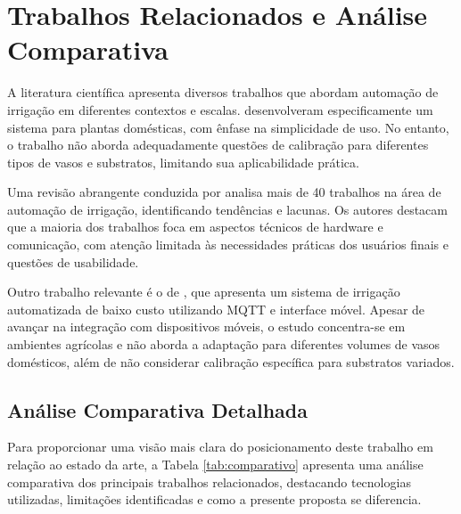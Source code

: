 \documentclass[twoside,english,brazilian]{UNISINOSmonografia}
\begin{document}
\section{Trabalhos Relacionados e Análise Comparativa}

A literatura científica apresenta diversos trabalhos que abordam automação de irrigação em diferentes contextos e escalas.  desenvolveram especificamente um sistema para plantas domésticas, com ênfase na simplicidade de uso. No entanto, o trabalho não aborda adequadamente questões de calibração para diferentes tipos de vasos e substratos, limitando sua aplicabilidade prática.

Uma revisão abrangente conduzida por  analisa mais de 40 trabalhos na área de automação de irrigação, identificando tendências e lacunas. Os autores destacam que a maioria dos trabalhos foca em aspectos técnicos de hardware e comunicação, com atenção limitada às necessidades práticas dos usuários finais e questões de usabilidade.

Outro trabalho relevante é o de , que apresenta um sistema de irrigação automatizada de baixo custo utilizando MQTT e interface móvel. Apesar de avançar na integração com dispositivos móveis, o estudo concentra-se em ambientes agrícolas e não aborda a adaptação para diferentes volumes de vasos domésticos, além de não considerar calibração específica para substratos variados.

\subsection{Análise Comparativa Detalhada}

Para proporcionar uma visão mais clara do posicionamento deste trabalho em relação ao estado da arte, a Tabela \ref{tab:comparativo} apresenta uma análise comparativa dos principais trabalhos relacionados, destacando tecnologias utilizadas, limitações identificadas e como a presente proposta se diferencia.
\end{document}
